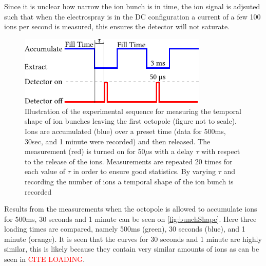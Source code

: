 Since it is unclear how narrow the ion bunch is in time, the ion signal is adjsuted such that when the electrospray is in the DC configuration a current of a few 100 ions per second is measured, this ensures the detector will not saturate.
\begin{figure}
    \centering
    \includegraphics[width = 0.8\textwidth]{main/ShapePulse.pdf}
    \caption{Illustration of the experimental sequence for measuring the temporal shape of ion bunches leaving the first octopole (figure not to scale). Ions are accumulated (blue) over a preset time (data for 500ms, 30sec, and 1 minute were recorded) and then released. The measurement (red) is turned on for 50$\mu$s with a delay $\tau$ with respect to the release of the ions.
    Measurements are repeated 20 times for each value of $\tau$ in order to ensure good statistics. By varying $\tau$ and recording the number of ions a temporal shape of the ion bunch is recorded}
    \label{fig:sequenceShape}
\end{figure}

Results from the measurements when the octopole is allowed to accumulate ions for 500ms, 30 seconds and 1 minute can be seen on 
\cref{fig:bunchShape}. Here three loading times are compared, namely 500ms (green), 30 seconds (blue), and 1 minute (orange).
It is seen that the curves for 30 seconds and 1 minute are highly similar, this is likely because they contain very similar amounts of ions as can be seen in \textcolor{red}{CITE LOADING}.

